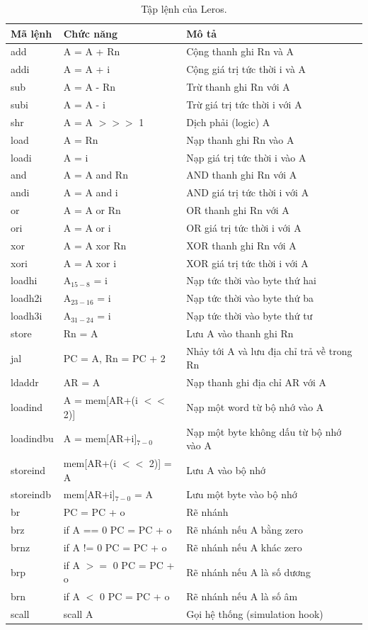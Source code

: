 \documentclass[%
    10pt,
    headinclude, footexclude,
    openright, %
    notitlepage,
    cleardoubleempty,
    headsepline,
    pointlessnumbers,
    bibtotoc, idxtotoc,
    ]{scrbook}
\begin{document}
\begin{table}
\centering
\begin{tabular}{lll}
\toprule
Mã lệnh & Chức năng & Mô tả\\
\midrule
add & A = A + Rn & Cộng thanh ghi Rn và A \\
addi & A = A + i & Cộng giá trị tức thời i và A \\
sub & A = A - Rn & Trừ thanh ghi Rn với A \\
subi & A = A - i & Trừ giá trị tức thời i với A \\
shr & A = A $>>>$ 1 & Dịch phải (logic) A \\
load & A = Rn & Nạp thanh ghi Rn vào A \\
loadi & A = i & Nạp giá trị tức thời i vào A \\
and & A = A and Rn & AND thanh ghi Rn với A \\
andi & A = A and i & AND giá trị tức thời i với A \\
or & A = A or Rn & OR thanh ghi Rn với A \\
ori & A = A or i & OR giá trị tức thời i với A \\
xor & A = A xor Rn & XOR thanh ghi Rn với A \\
xori & A = A xor i & XOR giá trị tức thời i với A \\
loadhi & A$_{15-8}$ = i & Nạp tức thời vào byte thứ hai \\
loadh2i & A$_{23-16}$ = i  & Nạp tức thời vào byte thứ ba \\
loadh3i & A$_{31-24}$ = i & Nạp tức thời vào byte thứ tư \\
store & Rn = A & Lưu A vào thanh ghi Rn \\
jal & PC = A, Rn = PC + 2 & Nhảy tới A và lưu địa chỉ trả về trong Rn \\
ldaddr & AR = A & Nạp thanh ghi địa chỉ AR với A \\
loadind & A = mem[AR+(i $<<$ 2)] & Nạp một word từ bộ nhớ vào A \\
loadindbu & A = mem[AR+i]$_{7-0}$  &  Nạp một byte không dấu từ bộ nhớ vào A \\
storeind & mem[AR+(i $<<$ 2)] = A & Lưu A vào bộ nhớ \\
storeindb & mem[AR+i]$_{7-0}$ = A & Lưu một byte vào bộ nhớ \\
br & PC = PC + o & Rẽ nhánh \\
brz & if A == 0 PC = PC + o & Rẽ nhánh nếu A bằng zero \\
brnz & if A != 0 PC = PC + o  & Rẽ nhánh nếu A khác zero \\
brp & if A $>=$ 0 PC = PC + o & Rẽ nhánh nếu A là số dương \\
brn & if A $<$ 0 PC = PC + o & Rẽ nhánh nếu A là số âm \\
scall & scall A & Gọi hệ thống (simulation hook) \\
\bottomrule
\end{tabular}
\caption{Tập lệnh của Leros.}
\label{tab:leros:isa}
\end{table}
\end{document}

